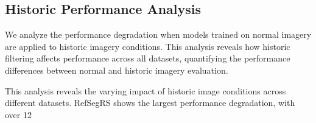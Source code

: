 \subsection{Historic Performance Analysis}
\label{subsec:historic_analysis}

We analyze the performance degradation when models trained on normal imagery are applied to historic imagery conditions. This analysis reveals how historic filtering affects performance across all datasets, quantifying the performance differences between normal and historic imagery evaluation.

\begin{table*}[t]
\centering
\caption{Historic vs. Normal Performance Analysis with Percentage Differences}
\label{tab:historic_performance_analysis}
\end{table*}

This analysis reveals the varying impact of historic image conditions across different datasets. RefSegRS shows the largest performance degradation, with over 12%

